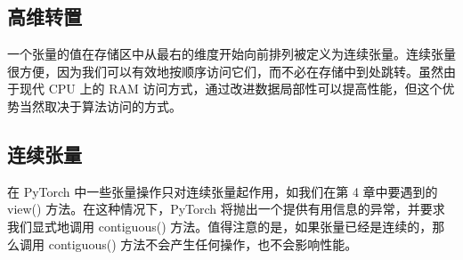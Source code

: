 \subsection{高维转置}
一个张量的值在存储区中从最右的维度开始向前排列被定义为连续张量。连续张量很方便，因为我们可以有效地按顺序访问它们，而不必在存储中到处跳转。虽然由于现代 CPU 上的 RAM 访问方式，通过改进数据局部性可以提高性能，但这个优势当然取决于算法访问的方式。

\subsection{连续张量}
在 PyTorch 中一些张量操作只对连续张量起作用，如我们在第 4 章中要遇到的 view() 方法。在这种情况下，PyTorch 将抛出一个提供有用信息的异常，并要求我们显式地调用 contiguous() 方法。值得注意的是，如果张量已经是连续的，那么调用 contiguous() 方法不会产生任何操作，也不会影响性能。